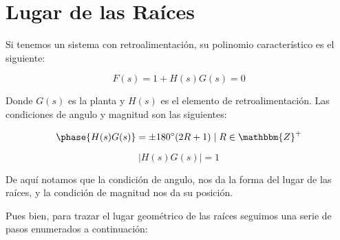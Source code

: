 
\chapter{Lugar de las Raíces}
	Si tenemos un sistema con retroalimentación, su polinomio característico es el siguiente:

	\begin{equation}
		F(s) = 1 + H(s) G(s) = 0
	\end{equation}

	Donde $G(s)$ es la planta y $H(s)$ es el elemento de retroalimentación. Las condiciones de angulo y magnitud son las siguientes:

	\begin{equation}
		\phase{H(s) G(s)} = \pm 180^{\circ} (2R + 1) \mid R \in \mathbbm{Z}^+
	\end{equation}

	\begin{equation}
		\lvert H(s) G(s) \rvert = 1
	\end{equation}

	De aquí notamos que la condición de angulo, nos da la forma del lugar de las raíces, y la condición de magnitud nos da su posición.

	Pues bien, para trazar el lugar geométrico de las raíces seguimos una serie de pasos enumerados a continuación:

